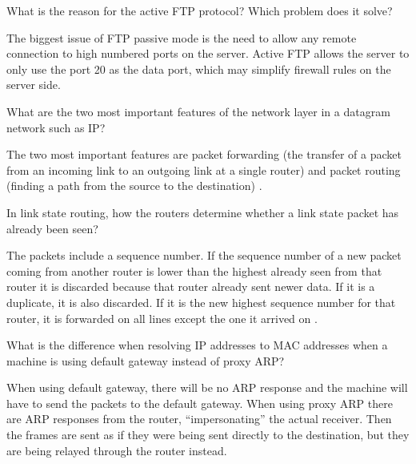 \begin{Exercise}
What is the reason for the active FTP protocol? Which problem does it solve?
\end{Exercise}
\begin{Answer}
The biggest issue of FTP passive mode is the need to allow any remote connection to high numbered ports on the server. Active FTP allows the server to only use the port 20 as the data port, which may simplify firewall rules on the server side.
\end{Answer}

\begin{Exercise}
What are the two most important features of the network layer in a datagram network such as IP?
\end{Exercise}
\begin{Answer}
The two most important features are packet forwarding (the transfer of a packet from an incoming link to an outgoing link at a single router) and packet routing (finding a path from the source to the destination) \cite[p.~305]{computer-networking-kurose-2012}.
\end{Answer}

\begin{Exercise}
In link state routing, how the routers determine whether a link state packet has already been seen?
\end{Exercise}
\begin{Answer}
The packets include a sequence number. If the sequence number of a new packet coming from another router is lower than the highest already seen from that router it is discarded because that router already sent newer data. If it is a duplicate, it is also discarded. If it is the new highest sequence number for that router, it is forwarded on all lines except the one it arrived on \cite[p.~376]{computer-networks-tanenbaum-2012}.
\end{Answer}

\begin{Exercise}
What is the difference when resolving IP addresses to MAC addresses when a machine is using default gateway instead of proxy ARP?
\end{Exercise}
\begin{Answer}
When using default gateway, there will be no ARP response and the machine will have to send the packets to the default gateway.
When using proxy ARP there are ARP responses from the router, ``impersonating'' the actual receiver.
Then the frames are sent as if they were being sent directly to the destination, but they are being relayed through the router instead.
\end{Answer}

